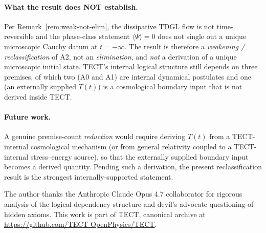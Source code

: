 \paragraph{What the result does NOT establish.}
Per Remark~\ref{rem:weak-not-elim}, the dissipative TDGL flow is not
time-reversible and the phase-class statement
$\langle\Psi\rangle = 0$ does not single out a unique microscopic
Cauchy datum at $t = -\infty$. The result is therefore a
\emph{weakening / reclassification} of A2, not an \emph{elimination},
and \emph{not} a derivation of a unique microscopic initial state.
TECT's internal logical structure still depends on three premises,
of which two (A0 and A1) are internal dynamical postulates and one
(an externally supplied $T(t)$) is a cosmological boundary input
that is not derived inside TECT.

\paragraph{Future work.}
A genuine premise-count \emph{reduction} would require deriving
$T(t)$ from a TECT-internal cosmological mechanism (or from general
relativity coupled to a TECT-internal stress--energy source), so
that the externally supplied boundary input becomes a derived
quantity. Pending such a derivation, the present reclassification
result is the strongest internally-supported statement.

\begin{acknowledgments}
The author thanks the Anthropic Claude Opus 4.7 collaborator for rigorous
analysis of the logical dependency structure and devil's-advocate
questioning of hidden axioms. This work is part of TECT, canonical archive
at \url{https://github.com/TECT-OpenPhysics/TECT}.
\end{acknowledgments}





